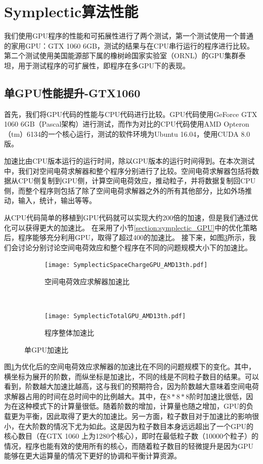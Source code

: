 \section{Symplectic算法性能}      \label{section:Symplectic_performance}
我们使用GPU程序的性能和可拓展性进行了两个测试，第一个测试使用一个普通的家用GPU：GTX 1060 6GB，测试的结果与在CPU串行运行的程序进行比较。第二个测试使用美国能源部下属的橡树岭国家实验室（ORNL）的GPU集群泰坦，用于测试程序的可扩展性，即程序在多GPU下的表现。

\subsection{单GPU性能提升-GTX1060}
首先，我们将GPU代码的性能与CPU代码进行比较。GPU代码使用GeForce GTX 1060 6GB（Pascal架构）进行测试，而作为对比的CPU代码使用AMD Opteron（tm）6134的一个核心运行，测试的软件环境为Ubuntu 16.04，使用CUDA 8.0版。

加速比由CPU版本运行的运行时间，除以GPU版本的运行时间得到。在本次测试中，我们对空间电荷求解器和整个程序分别进行了比较。空间电荷求解器包括将数据从CPU侧复制到GPU侧，计算空间电荷效应，推动粒子，并将数据复制回CPU侧，而整个程序则包括了除了空间电荷求解器之外的所有其他部分，比如外场推动，输入，统计，输出等等。

从CPU代码简单的移植到GPU代码就可以实现大约200倍的加速，但是我们通过优化可以获得更大的加速比。
在采用了小节\ref{section:symplectic_GPU}中的优化策略后，程序能够充分利用GPU，取得了超过400的加速比。
接下来，如图\ref{fig:OneGPU}所示，我们会讨论分别讨论空间电荷效应和整个程序在不同的问题规模大小下的加速比。

\begin{figure}[!htb]
    \centering
    \begin{subfigure}[b]{0.9\textwidth}
        \texttt{[image: SymplecticSpaceChargeGPU\_AMD13th.pdf]}
        \caption{空间电荷效应求解器加速比}
        \label{fig:SCOpt}
    \end{subfigure}
    \quad
    ~ %
    \begin{subfigure}[b]{0.9\textwidth}
        \texttt{[image: SymplecticTotalGPU\_AMD13th.pdf]}
        \caption{程序整体加速比}
        \label{fig:TotalOpt}
    \end{subfigure}
    \caption{单GPU加速比}\label{fig:OneGPU}
\end{figure}

图\ref{fig:SCOpt}为优化后的空间电荷效应求解器的加速比在不同的问题规模下的变化。其中，横坐标为展开的阶数，而纵坐标是加速比，不同的线是不同粒子数目的结果。可以看到，阶数越大加速比越高，这与我们的预期符合，因为阶数越大意味着空间电荷求解器占用的时间在总时间中的比例越大。其中，在$8*8*8$阶时加速比很低，因为在这种模式下的计算量很低。随着阶数的增加，计算量也随之增加，GPU的负载更为平衡，因此取得了更大的加速比。另一方面，粒子数目对于加速比的影响很小，在大阶数的情况下尤为如此。这是因为粒子数目本身远远超出了一个GPU的核心数目（在GTX 1060 上为1280个核心），即时在最低粒子数（10000个粒子）的情况，程序也能有效的使用所有的核心，而随着粒子数目的轻微提升是因为GPU能够在更大运算量的情况下更好的协调和平衡计算资源。

